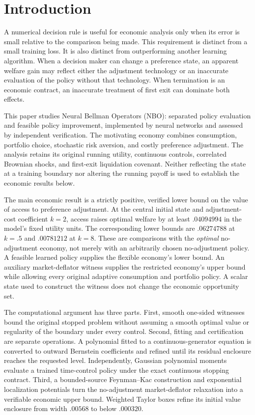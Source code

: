 \section{Introduction}
A numerical decision rule is useful for economic analysis only when its error is small relative to the comparison being made. This requirement is distinct from a small training loss. It is also distinct from outperforming another learning algorithm. When a decision maker can change a preference state, an apparent welfare gain may reflect either the adjustment technology or an inaccurate evaluation of the policy without that technology. When termination is an economic contract, an inaccurate treatment of first exit can dominate both effects.

This paper studies Neural Bellman Operators (NBO): separated policy evaluation and feasible policy improvement, implemented by neural networks and assessed by independent verification. The motivating economy combines consumption, portfolio choice, stochastic risk aversion, and costly preference adjustment. The analysis retains its original running utility, continuous controls, correlated Brownian shocks, and first-exit liquidation covenant. Neither reflecting the state at a training boundary nor altering the running payoff is used to establish the economic results below.

The main economic result is a strictly positive, verified lower bound on the value of access to preference adjustment. At the central initial state and adjustment-cost coefficient $k=2$, access raises optimal welfare by at least $.04094994$ in the model's fixed utility units. The corresponding lower bounds are $.06274788$ at $k=.5$ and $.00781212$ at $k=8$. These are comparisons with the \emph{optimal} no-adjustment economy, not merely with an arbitrarily chosen no-adjustment policy. A feasible learned policy supplies the flexible economy's lower bound. An auxiliary market-deflator witness supplies the restricted economy's upper bound while allowing every original adaptive consumption and portfolio policy. A scalar state used to construct the witness does not change the economic opportunity set.

The computational argument has three parts. First, smooth one-sided witnesses bound the original stopped problem without assuming a smooth optimal value or regularity of the boundary under every control. Second, fitting and certification are separate operations. A polynomial fitted to a continuous-generator equation is converted to outward Bernstein coefficients and refined until its residual enclosure reaches the requested level. Independently, Gaussian polynomial moments evaluate a trained time-control policy under the exact continuous stopping contract. Third, a bounded-source Feynman--Kac construction and exponential localization potentials turn the no-adjustment market-deflator relaxation into a verifiable economic upper bound. Weighted Taylor boxes refine its initial value enclosure from width $.00568$ to below $.000320$.

